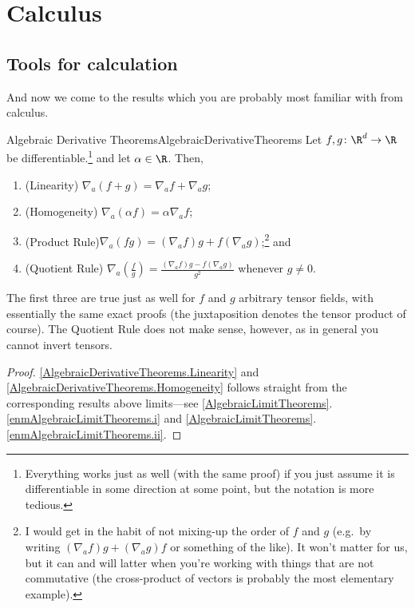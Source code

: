\section{Calculus}

\subsection{Tools for calculation}

And now we come to the results which you are probably most familiar with from calculus.
\begin{prp}{Algebraic Derivative Theorems\hfill}{AlgebraicDerivativeTheorems}
Let $f,g\colon \R ^d\rightarrow \R$ be differentiable.\footnote{Everything works just as well (with the same proof) if you just assume it is differentiable in some direction at some point, but the notation is more tedious.} and let $\alpha \in \R$.  Then,
\begin{enumerate}
\item \label{AlgebraicDerivativeTheorems.Linearity}(Linearity) $\nabla _a(f+g)=\nabla _af+\nabla _ag$;
\item \label{AlgebraicDerivativeTheorems.Homogeneity}(Homogeneity) $\nabla _a(\alpha f)=\alpha \nabla _af$;
\item \label{AlgebraicDerivativeTheorems.ProductRule}(Product Rule)$\nabla _a(fg)=(\nabla _af)g+f(\nabla _ag)$;\footnote{I would get in the habit of not mixing-up the order of $f$ and $g$ (e.g.~by writing $(\nabla _af)g+(\nabla _ag)f$ or something of the like).  It won't matter for us, but it can and will latter when you're working with things that are not commutative (the cross-product of vectors is probably the most elementary example).} and
\item \label{AlgebraicDerivativeTheorems.QuotientRule}(Quotient Rule) $\nabla _a\left( \frac{f}{g}\right) =\frac{(\nabla _af)g-f(\nabla _ag)}{g^2}$ whenever $g\neq 0$.
\end{enumerate}
\begin{rmk}
The first three are true just as well for $f$ and $g$ arbitrary tensor fields, with essentially the same exact proofs (the juxtaposition denotes the tensor product of course).  The Quotient Rule does not make sense, however, as in general you cannot invert tensors.
\end{rmk}
\begin{proof}
\cref{AlgebraicDerivativeTheorems.Linearity} and \cref{AlgebraicDerivativeTheorems.Homogeneity} follows straight from the corresponding results above limits---see \cref{AlgebraicLimitTheorems}.\cref{enmAlgebraicLimitTheorems.i} and \cref{AlgebraicLimitTheorems}.\cref{enmAlgebraicLimitTheorems.ii}.


\end{proof}
\end{prp}
